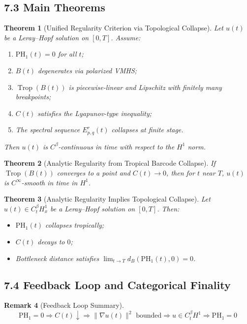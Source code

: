 \documentclass[11pt]{article}
\newtheorem{theorem}{Theorem}[section]
\theoremstyle{definition}
\newtheorem{remark}[theorem]{Remark}
\begin{document}
\subsection*{7.3 Main Theorems}

\begin{theorem}[Unified Regularity Criterion via Topological Collapse]
Let $u(t)$ be a Leray--Hopf solution on $[0,T]$. Assume:
\begin{enumerate}
  \item $\mathrm{PH}_1(t) = 0$ for all $t$;
  \item $B(t)$ degenerates via polarized VMHS;
  \item $\operatorname{Trop}(B(t))$ is piecewise-linear and Lipschitz with finitely many breakpoints;
  \item $C(t)$ satisfies the Lyapunov-type inequality;
  \item The spectral sequence $E^r_{p,q}(t)$ collapses at finite stage.
\end{enumerate}
Then $u(t)$ is $C^\beta$-continuous in time with respect to the $H^1$ norm.
\end{theorem}

\begin{theorem}[Analytic Regularity from Tropical Barcode Collapse]
If $\operatorname{Trop}(B(t))$ converges to a point and $C(t) \to 0$, then for $t$ near $T$, $u(t)$ is $C^\infty$-smooth in time in $H^1$.
\end{theorem}

\begin{theorem}[Analytic Regularity Implies Topological Collapse]
Let $u(t) \in C^\beta_t H^1_x$ be a Leray--Hopf solution on $[0, T]$. Then:
\begin{itemize}
  \item $\mathrm{PH}_1(t)$ collapses tropically;
  \item $C(t)$ decays to $0$;
  \item Bottleneck distance satisfies $\lim_{t \to T} d_B(\mathrm{PH}_1(t), 0) = 0$.
\end{itemize}
\end{theorem}

\subsection*{7.4 Feedback Loop and Categorical Finality}

\begin{remark}[Feedback Loop Summary]
\[
\text{PH}_1 = 0 \Longrightarrow C(t)\downarrow \Longrightarrow \|\nabla u(t)\|^2\text{ bounded} \Longrightarrow u \in C_t^\beta H^1 \Longrightarrow \text{PH}_1 = 0
\]
\end{remark}
\end{document}
